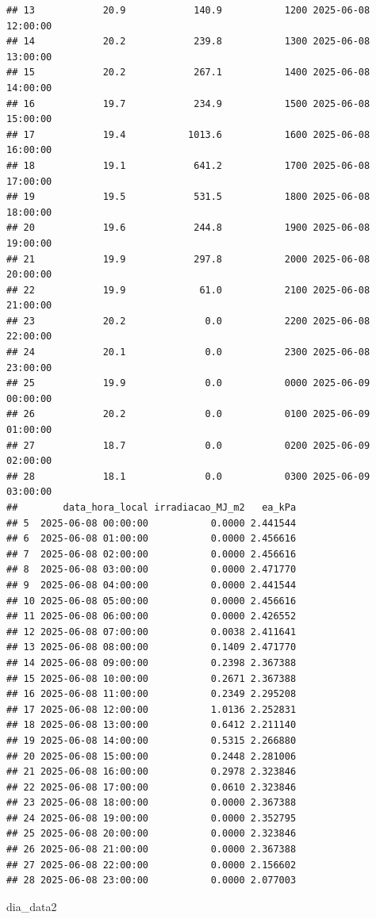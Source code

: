 \documentclass[
]{article}
\newenvironment{Shaded}{\begin{snugshade}}{\end{snugshade}}
\newcommand{\NormalTok}[1]{#1}
\begin{document}
\begin{verbatim}
## 13            20.9            140.9           1200 2025-06-08 12:00:00
## 14            20.2            239.8           1300 2025-06-08 13:00:00
## 15            20.2            267.1           1400 2025-06-08 14:00:00
## 16            19.7            234.9           1500 2025-06-08 15:00:00
## 17            19.4           1013.6           1600 2025-06-08 16:00:00
## 18            19.1            641.2           1700 2025-06-08 17:00:00
## 19            19.5            531.5           1800 2025-06-08 18:00:00
## 20            19.6            244.8           1900 2025-06-08 19:00:00
## 21            19.9            297.8           2000 2025-06-08 20:00:00
## 22            19.9             61.0           2100 2025-06-08 21:00:00
## 23            20.2              0.0           2200 2025-06-08 22:00:00
## 24            20.1              0.0           2300 2025-06-08 23:00:00
## 25            19.9              0.0           0000 2025-06-09 00:00:00
## 26            20.2              0.0           0100 2025-06-09 01:00:00
## 27            18.7              0.0           0200 2025-06-09 02:00:00
## 28            18.1              0.0           0300 2025-06-09 03:00:00
##        data_hora_local irradiacao_MJ_m2   ea_kPa
## 5  2025-06-08 00:00:00           0.0000 2.441544
## 6  2025-06-08 01:00:00           0.0000 2.456616
## 7  2025-06-08 02:00:00           0.0000 2.456616
## 8  2025-06-08 03:00:00           0.0000 2.471770
## 9  2025-06-08 04:00:00           0.0000 2.441544
## 10 2025-06-08 05:00:00           0.0000 2.456616
## 11 2025-06-08 06:00:00           0.0000 2.426552
## 12 2025-06-08 07:00:00           0.0038 2.411641
## 13 2025-06-08 08:00:00           0.1409 2.471770
## 14 2025-06-08 09:00:00           0.2398 2.367388
## 15 2025-06-08 10:00:00           0.2671 2.367388
## 16 2025-06-08 11:00:00           0.2349 2.295208
## 17 2025-06-08 12:00:00           1.0136 2.252831
## 18 2025-06-08 13:00:00           0.6412 2.211140
## 19 2025-06-08 14:00:00           0.5315 2.266880
## 20 2025-06-08 15:00:00           0.2448 2.281006
## 21 2025-06-08 16:00:00           0.2978 2.323846
## 22 2025-06-08 17:00:00           0.0610 2.323846
## 23 2025-06-08 18:00:00           0.0000 2.367388
## 24 2025-06-08 19:00:00           0.0000 2.352795
## 25 2025-06-08 20:00:00           0.0000 2.323846
## 26 2025-06-08 21:00:00           0.0000 2.367388
## 27 2025-06-08 22:00:00           0.0000 2.156602
## 28 2025-06-08 23:00:00           0.0000 2.077003
\end{verbatim}

\begin{Shaded}
\begin{Highlighting}[]
\NormalTok{dia\_data2}
\end{Highlighting}
\end{Shaded}
\end{document}
